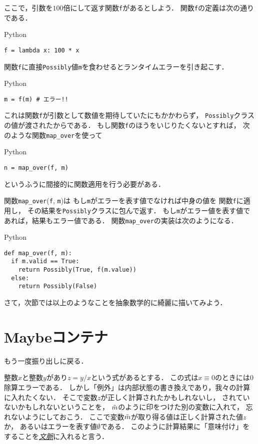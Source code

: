\documentclass[a5paper,draft]{jsbook}
\newcommand{\programminglanguage}[1]{\textsf{#1}}
\newcommand{\python}{\programminglanguage{Python}}
\newcommand{\keyword}[1]{{\underline{\emph{#1}}}}
\newcommand{\code}[1]{\texttt{#1}}
\newenvironment{pythoncode}{\begin{itembox}[r]{\python}}{\end{itembox}}
\newcommand{\mathMaybeVar}[1]{\Tilde{#1}}
\newcommand{\mathNothing}{\emptyset}%
\begin{document}
ここで，引数を$100$倍にして返す関数\code{f}があるとしよう．
関数\code{f}の定義は次の通りである．
\begin{pythoncode}
\begin{verbatim}
f = lambda x: 100 * x
\end{verbatim}
\end{pythoncode}

関数\code{f}に直接\code{Possibly}値\code{m}を食わせるとランタイムエラーを引き起こす．
\begin{pythoncode}
\begin{verbatim}
m = f(m) # エラー!!
\end{verbatim}
\end{pythoncode}
これは関数\code{f}が引数として数値を期待していたにもかかわらず，
\code{Possibly}クラスの値が渡されたからである．
もし関数\code{f}のほうをいじりたくないとすれば，
次のような関数\code{map\_over}を使って
\begin{pythoncode}
\begin{verbatim}
n = map_over(f, m)
\end{verbatim}
\end{pythoncode}
というふうに間接的に関数適用を行う必要がある．

関数\code{map\_over}(\code{f}, \code{m})は
もし\code{m}がエラーを表す値でなければ中身の値を
関数\code{f}に適用し，
その結果を\code{Possibly}クラスに包んで返す．
もし\code{m}がエラー値を表す値であれば，結果もエラー値である．
関数\code{map\_over}の実装は次のようになる．
\begin{pythoncode}
\begin{verbatim}
def map_over(f, m):
  if m.valid == True:
    return Possibly(True, f(m.value))
  else:
    return Possibly(False)
\end{verbatim}
\end{pythoncode}

さて，次節では以上のようなことを抽象数学的に綺麗に描いてみよう．

\section{Maybeコンテナ}

もう一度振り出しに戻る．

整数$x$と整数$y$があり$z=y/x$という式があるとする．
この式は$x\equiv0$のときには$0$除算エラーである．
しかし「例外」は内部状態の書き換えであり，我々の計算に入れたくない．
そこで変数$z$が正しく計算されたかもしれないし，
されていないかもしれないということを，
$\mathMaybeVar{m}$のように印をつけた別の変数に入れて，
忘れないようにしておこう．
ここで変数$\mathMaybeVar{m}$が取り得る値は正しく計算された値$z$か，
あるいはエラーを表す値$\mathNothing$である．
このように計算結果に「意味付け」をすることを\keyword{文脈}に入れると言う．
\end{document}
